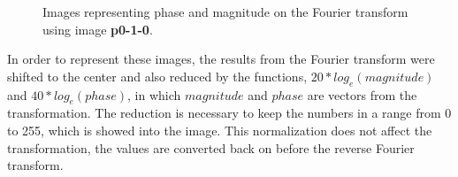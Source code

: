 \documentclass[12pt,a4paper]{article}
\begin{document}
\begin{figure}[!h]
	\centering
	\quad
	\caption{Images representing phase and magnitude on the Fourier transform using image \textbf{p0-1-0}.}
	\label{fig:mag-phase}
\end{figure}

In order to represent these images, the results from the Fourier transform were shifted to the center and also reduced by the functions, $20*log_e(magnitude)$ and $40*log_e(phase)$, in which $magnitude$ and $phase$ are vectors from the transformation. The reduction is necessary to keep the numbers in a range from 0 to 255, which is showed into the image. This normalization does not affect the transformation, the values are converted back on before the reverse Fourier transform. \\
\end{document}
